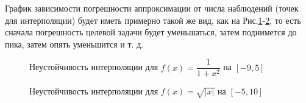 \documentclass[a4paper]{article}
\begin{document}
График зависимости погрешности аппроксимации от числа наблюдений (точек для интерполяции) будет иметь примерно такой же вид, как на Рис.\ref{runge1}-\ref{runge2}, то есть
сначала погрешность целевой задачи будет уменьшаться, затем поднимется до пика, затем опять уменьшится и т. д.

\begin{figure}[!h]
  \noindent{}
  \caption{Неустойчивость интерполяции для $f(x)=\dfrac{1}{1+x^2}$ на $[-9,5]$}
  \label{runge1}
\end{figure}
\begin{figure}[!h]
  \noindent{}
  \caption{Неустойчивость интерполяции для $f(x)=\sqrt{|x|}$ на $[-5,10]$}
  \label{runge2}
\end{figure}
\end{document}
